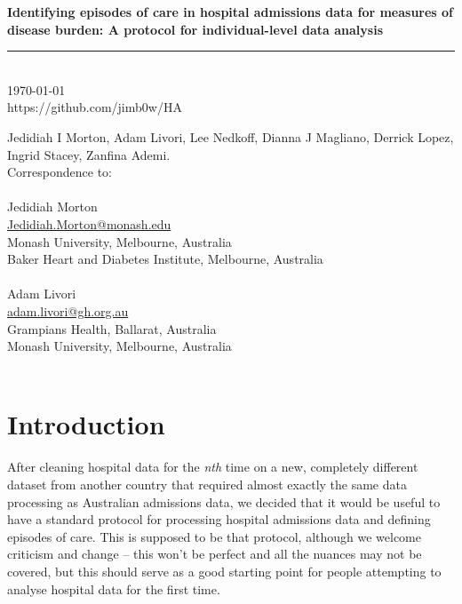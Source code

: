 \documentclass[11pt]{article}
\newcommand{\thedate}{\today}
\begin{document}
\begin{titlepage}
    \begin{flushright}
        \Huge
        \textbf{Identifying episodes of care in hospital admissions data for measures of disease burden: A protocol for individual-level data analysis}
\color{black}
\rule{16cm}{2mm} \\
\Large
\color{black}
\thedate \\
\color{blue}
https://github.com/jimb0w/HA \\
\color{black}
       \vfill
    \end{flushright}
        \Large

\noindent
Jedidiah I Morton, 
Adam Livori, 
Lee Nedkoff, 
Dianna J Magliano, 
Derrick Lopez,
Ingrid Stacey,
Zanfina Ademi.  \\

 
\noindent Correspondence to: \\
 \\
Jedidiah Morton \\
\color{blue}
\href{mailto:Jedidiah.Morton@Monash.edu}{Jedidiah.Morton@monash.edu} \\ 
\color{black}
Monash University, Melbourne, Australia \\
Baker Heart and Diabetes Institute, Melbourne, Australia \\\
 \\
\noindent
Adam Livori \\
\color{blue}
\href{mailto:adam.livori@gh.org.au}{adam.livori@gh.org.au} \\ 
\color{black}
Grampians Health, Ballarat, Australia \\
Monash University, Melbourne, Australia \\\
\normalsize
\end{titlepage}

\clearpage
\tableofcontents


\clearpage
\section{Introduction}
\label{introduction}

After cleaning hospital data for the \emph{nth} time on a new, 
completely different dataset from another country that required almost exactly
the same data processing as Australian admissions data, we decided
that it would be useful to have a standard protocol for processing hospital admissions data and 
defining episodes of care. 
This is supposed to be that protocol, although we welcome criticism and change -- 
this won't be perfect and all the nuances may not be covered, but this should serve as a good 
starting point for people attempting to analyse hospital data for the first time. 
\end{document}
